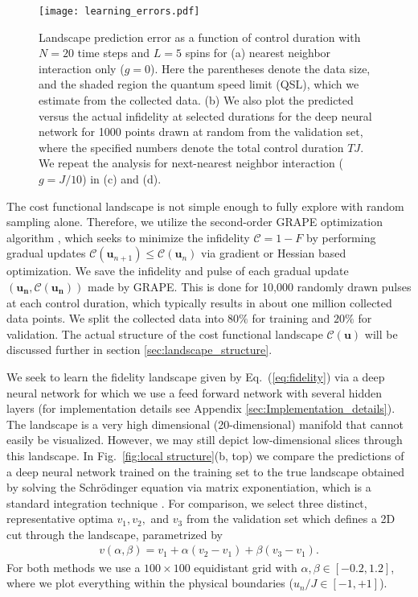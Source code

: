 \documentclass[aps, twocolumn,superscriptaddress]{revtex4-1}
\begin{document}
\begin{figure*}
    \centering
    \texttt{[image: learning\_errors.pdf]}
    \caption{Landscape prediction error as a function of control duration with $N=20$ time steps and $L=5$ spins for (a) nearest neighbor interaction only ($g=0$). Here the parentheses denote the data size, and the shaded region the quantum speed limit (QSL), which we estimate from the collected data. (b) We also plot the predicted versus the actual infidelity at selected durations for the deep neural network for 1000 points drawn at random from the validation set, where the specified numbers denote the total control duration $TJ$. We repeat the analysis for next-nearest neighbor interaction ($g = J/10$) in (c) and (d).}
    \label{fig:spin_chain_learning}
\end{figure*}

The cost functional landscape is not simple enough to fully explore with random sampling alone. Therefore, we utilize the second-order GRAPE optimization algorithm \cite{khaneja2005optimal,motzoi2011optimal,de2011second,dalgaard2020hessian}, which seeks to minimize the infidelity $\mathcal{C} = 1-F$ by performing gradual updates $\mathcal{C} (\mathbf{u}_{n+1}) \leq \mathcal{C} (\mathbf{u}_{n})$ via gradient or Hessian based optimization. We save the infidelity and pulse of each gradual update $(\mathbf{u_n}, \mathcal{C}(\mathbf{u_n}))$ made by GRAPE. This is done for 10,000 randomly drawn pulses at each control duration, which typically results in about one million collected data points. We split the collected data into $80\%$ for training and $20\%$ for validation. The actual structure of the cost functional landscape $\mathcal{C}(\mathbf{u})$ will be discussed further in section \ref{sec:landscape_structure}. 

We seek to learn the fidelity landscape given by Eq.~(\ref{eq:fidelity}) via a deep neural network for which we use a feed forward network with several hidden layers (for implementation details see Appendix \ref{sec:Implementation_details}). The landscape is a very high dimensional (20-dimensional) manifold that cannot easily be visualized. However, we may still depict low-dimensional slices through this landscape. In Fig.~\ref{fig:local structure}(b, top) we compare the predictions of a deep neural network trained on the training set to the true landscape obtained by solving the Schrödinger equation via matrix exponentiation, which is a standard integration technique \cite{blanes2009magnus}. For comparison, we select three distinct, representative optima $v_1, v_2,$ and $v_3$ from the validation set which defines a 2D cut through the landscape, parametrized by
\begin{align}
    v(\alpha,\beta) = v_1 + \alpha(v_2-v_1) + \beta(v_3-v_1).
\end{align}
For both methods we use a $100 \times 100$ equidistant grid with $\alpha,\beta \in [-0.2, 1.2]$, where we plot everything within the physical boundaries ($u_n/J \in [-1,+1]$).
\end{document}
